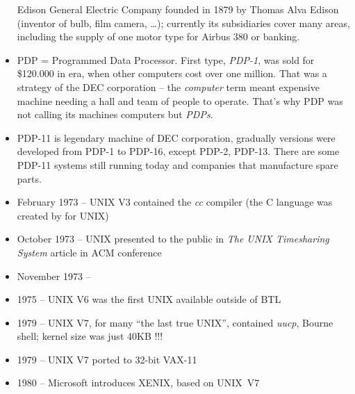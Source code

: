 \begin{itemize}
Edison General Electric Company founded in 1879 by Thomas Alva Edison
(inventor of bulb, film camera, \dots); currently its subsidiaries cover many
areas, including the supply of one motor type for Airbus 380 or banking.
\item PDP = Programmed Data Processor. First type, \emph{PDP-1}, was sold for
\$120.000 in era, when other computers cost over one million. That was a
strategy of the DEC corporation -- the \emph{computer} term meant expensive
machine needing a hall and team of people to operate. That's why PDP was not
calling its machines computers but \emph{PDPs}.
\item PDP-11 is legendary machine of DEC corporation, gradually versions were
developed from PDP-1 to PDP-16, except PDP-2, PDP-13. There are some PDP-11
systems still running today and companies that manufacture spare parts. 
\end{itemize}


\begin{slide}
\begin{itemize}
\item February 1973 -- UNIX V3 contained the \emph{cc} compiler (the C
language was created by  for UNIX)
\item October 1973 -- UNIX presented to the public in \emph{The
UNIX Timesharing System} article in ACM conference
\item November 1973 -- 
\item 1975 -- UNIX V6 was the first UNIX available outside of BTL
\item 1979 -- UNIX V7, for many ``the last true UNIX'', contained
\emph{uucp}, Bourne shell; kernel size was just 40KB !!!
\item 1979 -- UNIX V7 ported to 32-bit VAX-11
\item 1980 -- Microsoft introduces XENIX, based on UNIX~V7
\end{itemize}
\end{slide}

